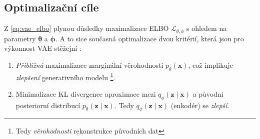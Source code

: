 \subsection{Optimalizační cíle}
Z \autoref{eq:vae_elbo} plynou důsledky maximalizace ELBO $\mathcal{L_{\theta,\phi}}$ s ohledem na parametry $\boldsymbol{\theta}$ a $\boldsymbol{\phi}$.
A to sice současná optimalizace dvou kritérií, která jsou pro výkonnost VAE stěžejní \cite{Kingma2019}:

\begin{enumerate}
    \item \emph{Přibližná} maximalizace marginální věrohodnosti $p_\theta(\textbf{x})$, což implikuje \emph{zlepšení} generativního modelu \footnote{Tedy \emph{věrohodnosti} rekonstrukce původních dat}.
    \item Minimalizace KL divergence aproximace mezi $q_\phi(\textbf{z}\mid\textbf{x})$ a původní posteriorní distribucí $p_\theta(\textbf{z}\mid\textbf{x})$. Tedy $q_\phi(\textbf{z}\mid\textbf{x})$ (enkodér) se \emph{zlepší}.
\end{enumerate}